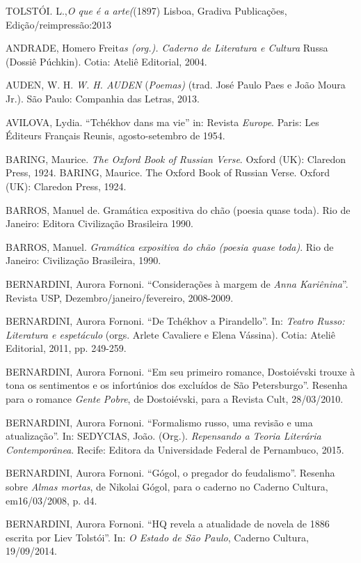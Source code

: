 TOLSTÓI. L.,\emph{O que é a arte(}(1897) Lisboa, Gradiva Publicações,
Edição/reimpressão:2013


ANDRADE, Homero Freit\emph{as (org.). Caderno de Literatura e Cultura}
Russa (Dossiê Púchkin). Cotia: Ateliê Editorial, 2004.

AUDEN, W. H. \emph{W. H. AUDEN} (\emph{Poemas)} (trad. José Paulo Paes e
João Moura Jr.). São Paulo: Companhia das Letras, 2013.

AVILOVA, Lydia. ``Tchékhov dans ma vie'' in: Revista \emph{Europe}.
Paris: Les Éditeurs Français Reunis, agosto-setembro de 1954.

BARING, Maurice. \emph{The Oxford Book of
Russian Verse}. Oxford (UK): Claredon Press,
1924. BARING, Maurice. The Oxford Book of Russian Verse. Oxford (UK): Claredon Press, 1924.\label{baring-maurice.-the-oxford-book-of-russian-verse.-oxford-uk-claredon-press-1924.}

BARROS, Manuel de. Gramática expositiva do chão (poesia quase toda). Rio
de Janeiro: Editora Civilização Brasileira 1990.

BARROS, Manuel. \emph{Gramática expositiva do chão (poesia quase toda)}.
Rio de Janeiro: Civilização Brasileira, 1990.

BERNARDINI, Aurora Fornoni. ``Considerações à margem de \emph{Anna
Kariênina}''. Revista USP, Dezembro/janeiro/fevereiro, 2008-2009.

BERNARDINI, Aurora Fornoni. ``De Tchékhov a Pirandello''. In:
\emph{Teatro Russo: Literatura e espetáculo} (orgs. Arlete Cavaliere e
Elena Vássina). Cotia: Ateliê Editorial, 2011, pp. 249-259.

BERNARDINI, Aurora Fornoni. ``Em seu primeiro romance, Dostoiévski
trouxe à tona os sentimentos e os infortúnios dos excluídos de São
Petersburgo''. Resenha para o romance \emph{Gente Pobre}, de
Dostoiévski, para a Revista Cult, 28/03/2010.

BERNARDINI, Aurora Fornoni. ``Formalismo russo, uma revisão e uma
atualização''. In: SEDYCIAS, João. (Org.). \emph{Repensando a Teoria
Literária Contemporânea}. Recife: Editora da Universidade Federal de
Pernambuco, 2015.

BERNARDINI, Aurora Fornoni. ``Gógol, o pregador do feudalismo''. Resenha
sobre \emph{Almas mortas}, de Nikolai Gógol, para o caderno no Caderno
Cultura, em16/03/2008, p. d4.

BERNARDINI, Aurora Fornoni. ``HQ revela a atualidade de novela de 1886
escrita por Liev Tolstói''. In: \emph{O Estado de São Paulo}, Caderno
Cultura, 19/09/2014.


